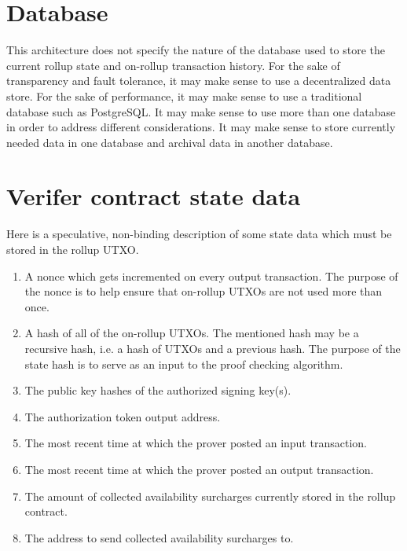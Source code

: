 \documentclass[12pt]{article}
\begin{document}
\section{Database}

This architecture does not specify the nature of the database used to store the current rollup state and on-rollup transaction history. For the sake of transparency and fault tolerance, it may make sense to use a decentralized data store. For the sake of performance, it may make sense to use a traditional database such as PostgreSQL. It may make sense to use more than one database in order to address different considerations. It may make sense to store currently needed data in one database and archival data in another database.


\section{Verifer contract state data}

Here is a speculative, non-binding description of some state data which must be stored in the rollup UTXO.

\begin{enumerate}
	\item A nonce which gets incremented on every output transaction. The purpose of the nonce is to help ensure that on-rollup UTXOs are not used more than once. 
	\item A hash of all of the on-rollup UTXOs. The mentioned hash may be a recursive hash, i.e. a hash of UTXOs and a previous hash. The purpose of the state hash is to serve as an input to the proof checking algorithm.
	\item The public key hashes of the authorized signing key(s).
	\item The authorization token output address.
	\item The most recent time at which the prover posted an input transaction.
	\item The most recent time at which the prover posted an output transaction.
	\item The amount of collected availability surcharges currently stored in the rollup contract.
	\item The address to send collected availability surcharges to.
\end{enumerate}




\clearpage
\end{document}
